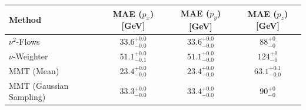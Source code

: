     \begin{tabular}{lccc}
        \toprule
        Method & MAE ($p_x$) [GeV] & MAE ($p_y$) [GeV] & MAE ($p_z$) [GeV] \\
        \midrule
        $\nu^2$-Flows & $33.6_{-0.0}^{+0.0}$ & $33.6_{-0.0}^{+0.0}$ & $88_{-0}^{+0}$ \\
        $\nu$-Weighter & $51.1_{-0.1}^{+0.0}$ & $51.1_{-0.0}^{+0.0}$ & $124_{-0}^{+0}$ \\
        MMT (Mean) & $23.4_{-0.0}^{+0.0}$ & $23.4_{-0.0}^{+0.0}$ & $63.1_{-0.0}^{+0.1}$ \\
        MMT (Gaussian Sampling) & $33.3_{-0.0}^{+0.0}$ & $33.4_{-0.0}^{+0.0}$ & $90_{-0}^{+0}$ \\
        \bottomrule
    \end{tabular}